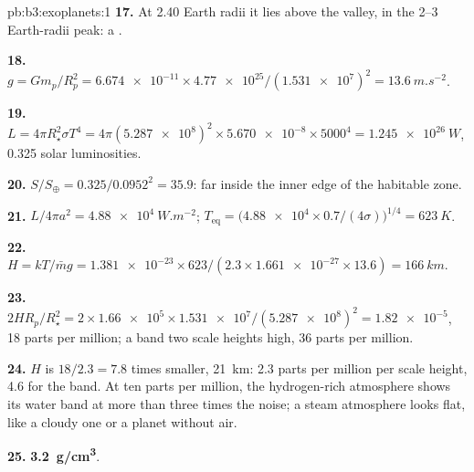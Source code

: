 \begin{solution}{pb:b3:exoplanets:1}
\textbf{17.} At 2.40 Earth radii it lies above the valley, in the 2--3 Earth-radii
peak: a .

\textbf{18.} $g = Gm_p/R_p^2 = \num{6.674e-11}\times\num{4.77e25}/(\num{1.531e7})^2 =
\qty{13.6}{m.s^{-2}}$.

\textbf{19.} $L = 4\pi R_\star^2\sigma T^4 = 4\pi(\num{5.287e8})^2\times\num{5.670e-8}
\times5000^4 = \qty{1.245e26}{W}$, 0.325 solar luminosities.

\textbf{20.} $S/S_\oplus = 0.325/0.0952^2 = 35.9$: far inside the inner edge of
the habitable zone.

\textbf{21.} $L/4\pi a^2 = \qty{4.88e4}{W.m^{-2}}$; $T_\mathrm{eq} =
\bigl(\num{4.88e4}\times0.7/(4\sigma)\bigr)^{1/4} = \qty{623}{K}$.

\textbf{22.} $H = kT/\bar m g = \num{1.381e-23}\times623/(2.3\times\num{1.661e-27}
\times13.6) = \qty{166}{km}$.

\textbf{23.} $2HR_p/R_\star^2 = 2\times\num{1.66e5}\times\num{1.531e7}/
(\num{5.287e8})^2 = \num{1.82e-5}$, 18 parts per million; a band two
scale heights high, 36 parts per million.

\textbf{24.} $H$ is $18/2.3 = 7.8$ times smaller, \qty{21}{km}: 2.3 parts per
million per scale height, 4.6 for the band. At ten parts per million, the
hydrogen-rich atmosphere shows its water band at more than three times
the noise; a steam atmosphere looks flat, like a cloudy one or a planet
without air.

\textbf{25.} \textbf{\qty[text-series-to-math=true]{3.2}{g/cm^3}}.
\end{solution}
